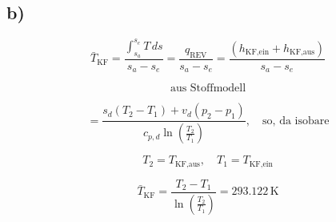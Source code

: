 

\subsection*{b)}

\[
\bar{T}_{\text{KF}} = \frac{\int_{s_a}^{s_e} T \, ds}{s_a - s_e} = \frac{q_{\text{REV}}}{s_a - s_e} = \frac{(h_{\text{KF,ein}} + h_{\text{KF,aus}})}{s_a - s_e}
\]

\[
\text{aus Stoffmodell}
\]

\[
= \frac{s_{d} (T_2 - T_1) + v_d (p_2 - p_1)}{c_{p,d} \ln \left( \frac{T_2}{T_1} \right)}, \quad \text{so, da isobare}
\]

\[
T_2 = T_{\text{KF,aus}}, \quad T_1 = T_{\text{KF,ein}}
\]

\[
\bar{T}_{\text{KF}} = \frac{T_2 - T_1}{\ln \left( \frac{T_2}{T_1} \right)} = 293.122 \, \text{K}
\]